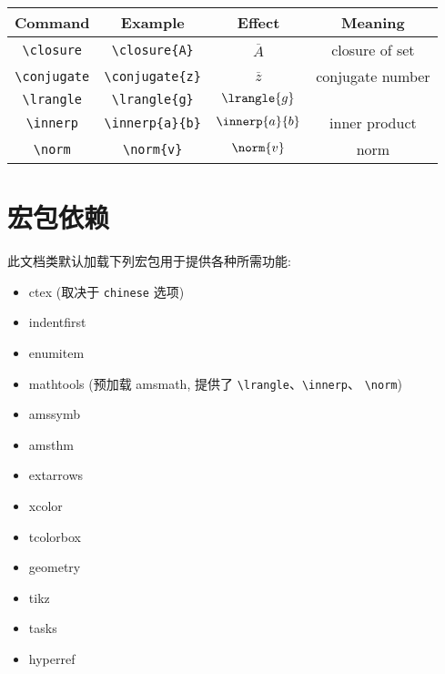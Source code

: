 \documentclass{article}
\newcommand{\option}[1]{\texttt{#1}}
\newcommand{\pkg}[1]{\textsf{#1}}
\begin{document}
\begin{center}
  \begin{tabular}{cccc}
    \toprule
      Command & Example & Effect & Meaning \\
    \midrule
      \verb|\closure| & \verb|\closure{A}| & $\overline{A}$ & closure of set \\
      \verb|\conjugate| & \verb|\conjugate{z}| & $\overline{z}$ & conjugate number \\
      \verb|\lrangle| & \verb|\lrangle{g}| & $\lrangle{g}$ &  \\
      \verb|\innerp| & \verb|\innerp{a}{b}| & $\innerp{a}{b}$ & inner product \\
      \verb|\norm| & \verb|\norm{v}| & $\norm{v}$ & norm \\
    \bottomrule
  \end{tabular}
\end{center}


\section{宏包依赖}

此文档类默认加载下列宏包用于提供各种所需功能:
\begin{itemize}
  \item \pkg{ctex} (取决于 \option{chinese} 选项)
  \item \pkg{indentfirst}
  \item \pkg{enumitem}
  \item \pkg{mathtools} (预加载 \pkg{amsmath}, 提供了 \verb|\lrangle|、\verb|\innerp|、
    \verb|\norm|)
  \item \pkg{amssymb}
  \item \pkg{amsthm}
  \item \pkg{extarrows}
  \item \pkg{xcolor}
  \item \pkg{tcolorbox}
  \item \pkg{geometry}
  \item \pkg{tikz}
  \item \pkg{tasks}
  \item \pkg{hyperref}
\end{itemize}
\end{document}
